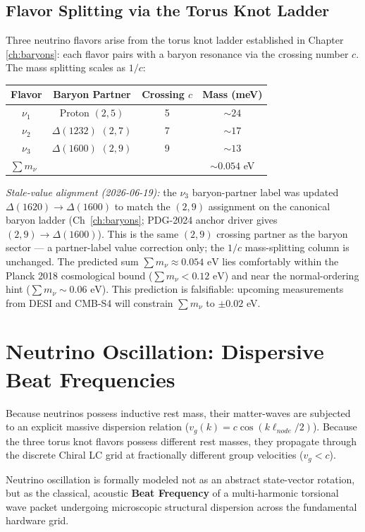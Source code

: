 \subsection{Flavor Splitting via the Torus Knot Ladder}
Three neutrino flavors arise from the torus knot ladder established in Chapter \ref{ch:baryons}: each flavor pairs with a baryon resonance via the crossing number $c$. The mass splitting scales as $1/c$:
\begin{center}
\begin{tabular}{|c|c|c|c|}
\hline
Flavor & Baryon Partner & Crossing $c$ & Mass (meV) \\ \hline
$\nu_1$ & Proton $(2,5)$  & 5 & $\sim 24$ \\
$\nu_2$ & $\Delta(1232)$ $(2,7)$ & 7 & $\sim 17$ \\
$\nu_3$ & $\Delta(1600)$ $(2,9)$ & 9 & $\sim 13$ \\ \hline
\multicolumn{3}{|l|}{$\sum m_\nu$} & $\sim 0.054$ eV \\ \hline
\end{tabular}
\end{center}
\noindent\emph{Stale-value alignment (2026-06-19):} the $\nu_3$ baryon-partner label was updated $\Delta(1620) \to \Delta(1600)$ to match the $(2,9)$ assignment on the canonical baryon ladder (Ch~\ref{ch:baryons}; PDG-2024 anchor driver gives $(2,9) \to \Delta(1600)$). This is the same $(2,9)$ crossing partner as the baryon sector --- a partner-label value correction only; the $1/c$ mass-splitting column is unchanged.
The predicted sum $\sum m_\nu \approx 0.054 \text{ eV}$ lies comfortably within the Planck 2018 cosmological bound ($\sum m_\nu < 0.12 \text{ eV}$) and near the normal-ordering hint ($\sum m_\nu \sim 0.06 \text{ eV}$). This prediction is falsifiable: upcoming measurements from DESI and CMB-S4 will constrain $\sum m_\nu$ to $\pm 0.02$ eV.

\section{Neutrino Oscillation: Dispersive Beat Frequencies}
Because neutrinos possess inductive rest mass, their matter-waves are subjected to an explicit massive dispersion relation ($v_g(k) = c \cos(k \ell_{node}/2)$). Because the three torus knot flavors possess different rest masses, they propagate through the discrete Chiral LC grid at fractionally different group velocities ($v_g < c$).

Neutrino oscillation is formally modeled not as an abstract state-vector rotation, but as the classical, acoustic \textbf{Beat Frequency} of a multi-harmonic torsional wave packet undergoing microscopic structural dispersion across the fundamental hardware grid.

